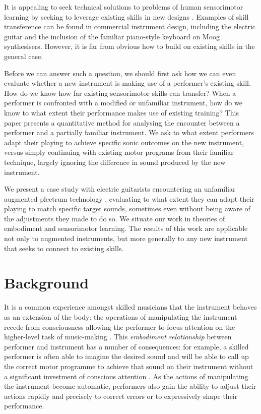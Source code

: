 \documentclass[sigconf]{nimeart}
\begin{document}
It is appealing to seek technical solutions to problems of human sensorimotor learning by seeking to leverage existing skills in new designs \cite{cook2001principles}. Examples of skill transference can be found in commercial instrument design, including the electric guitar and the inclusion of the familiar piano-style keyboard on Moog synthesisers. However, it is far from obvious how \emph{} to build on existing skills in the general case.

Before we can answer such a question, we should first ask how we can even evaluate whether a new instrument is making use of a performer's existing skill. How do we know how far existing sensorimotor skills can transfer? When a performer is confronted with a modified or unfamiliar instrument, how do we know to what extent their performance makes use of existing training? This paper presents a quantitative method for analysing the encounter between a performer and a partially familiar instrument. We ask to what extent performers adapt their playing to achieve specific sonic outcomes on the new instrument, versus simply continuing with existing motor programs from their familiar technique, largely ignoring the difference in sound produced by the new instrument.

We present a case study with electric guitarists encountering an unfamiliar augmented plectrum technology \cite{morreale2019magpick}, evaluating to what extent they can adapt their playing to match specific target sounds, sometimes even without being aware of the adjustments they made to do so. We situate our work in theories of embodiment and sensorimotor learning. The results of this work are applicable not only to augmented instruments, but more generally to any new instrument that seeks to connect to existing skills.

\section{Background}\label{background}

It is a common experience amongst skilled musicians that the instrument behaves as an extension of the body: the operations of manipulating the instrument recede from consciousness allowing the performer to focus attention on the higher-level task of music-making \cite{leman2010user,nijs2017merging}. This \emph{embodiment relationship} \cite{c8,magnusson2009epistemic} between performer and instrument has a number of consequences: for example, a skilled performer is often able to imagine the desired sound and will be able to call up the correct motor programme to achieve that sound on their instrument without a significant investment of conscious attention \cite{zatorre2007brain}. As the actions of manipulating the instrument become automatic, performers also gain the ability to adjust their actions rapidly and precisely to correct errors or to expressively shape their performance.~
\end{document}
